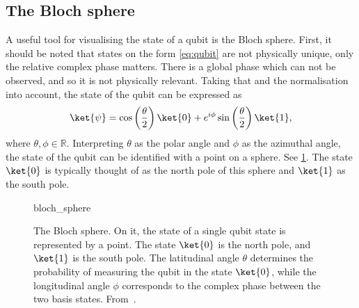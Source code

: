 \subsection{The Bloch sphere}
A useful tool for visualising the state of a qubit is the Bloch sphere.
First, it should be noted that states on the form \cref{eq:qubit} are not physically unique, only the relative complex phase matters.
There is a global phase which can not be observed, and so it is not physically relevant.
Taking that and the normalisation into account, the state of the qubit can be expressed as
\begin{equation}
  \ket{\psi} = \cos\left(\frac{\theta}{2}\right) \ket{0} + e^{i\phi} \sin\left(\frac{\theta}{2}\right) \ket{1},
  \label{eq:bloch}
\end{equation}
where $\theta, \phi \in \mathbb{R}$.
Interpreting $\theta$ as the polar angle and $\phi$ as the azimuthal angle, the state of the qubit can be identified with a point on a sphere.
See \cref{fig:bloch}.
The state $\ket{0}$ is typically thought of as the north pole of this sphere and $\ket{1}$ as the south pole.

\begin{figure}[t]
  \centering
  \def\svgwidth{0.62\textwidth}
  {bloch_sphere}
  \caption[
    The Bloch sphere.
  ]
  {
    The Bloch sphere.
    On it, the state of a single qubit state is represented by a point.
    The state $\ket{0}$ is the north pole, and $\ket{1}$ is the south pole.
    The latitudinal angle $\theta$ determines the probability of measuring the qubit in the state $\ket{0}$, while the longitudinal angle $\phi$ corresponds to the complex phase between the two basis states.
    From~\autocite{wikipedia_bloch}.
  }
  \label{fig:bloch}
\end{figure}

